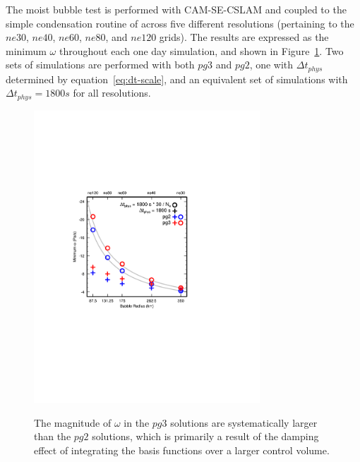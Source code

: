 The moist bubble test is performed with CAM-SE-CSLAM and coupled to the simple condensation routine of \cite{K1969MM} across five different resolutions (pertaining to the $ne30$, $ne40$, $ne60$, $ne80$, and $ne120$ grids). The results are expressed as the minimum $\omega$ throughout each one day simulation, and shown in Figure~\ref{fig:bubble}. Two sets of simulations are performed with both $pg3$ and $pg2$, one with $\Delta t_{phys}$ determined by equation~\eqref{eq:dt-scale}, and an equivalent set of simulations with $\Delta t_{phys} = 1800s$ for all resolutions. 

\begin{figure}[t]
\begin{center}
\noindent\includegraphics[width=20pc,angle=0]{chapter5/bubble_test.pdf}\\
\end{center}
\caption{The magnitude of $\omega$ in the $pg3$ solutions are systematically larger than the $pg2$ solutions, which is primarily a result of the damping effect of integrating the basis functions over a larger control volume.}
\label{fig:bubble}
\end{figure}

